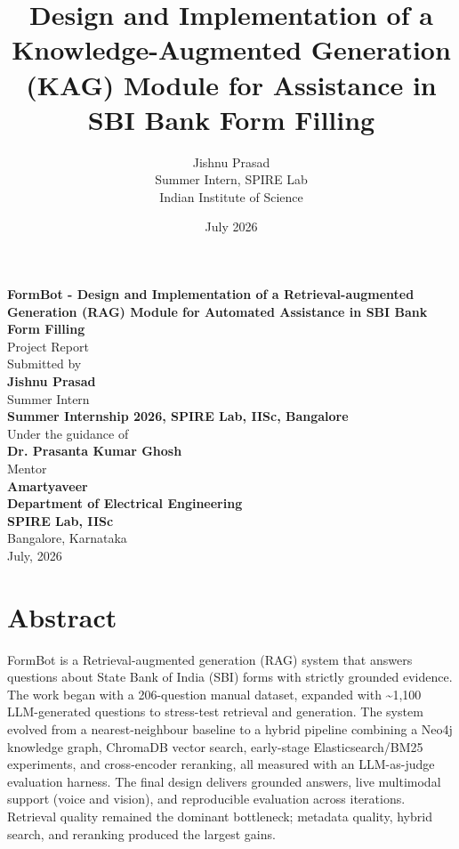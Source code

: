 \documentclass[11pt,a4paper]{article}
\title{
    \vspace{-1.5cm}
    \textbf{\Large Design and Implementation of a Knowledge-Augmented Generation (KAG) Module for Assistance in SBI Bank Form Filling}
}
\author{
    Jishnu Prasad \\
    Summer Intern, SPIRE Lab \\
    Indian Institute of Science
}
\date{July 2026}
\begin{document}
\begin{titlepage}
\centering
\vspace*{2cm}
{\LARGE \textbf{FormBot - Design and Implementation of a Retrieval-augmented Generation (RAG) Module for Automated Assistance in SBI Bank Form Filling}}\\[1cm]
{\large Project Report}\\[2cm]

{\large Submitted by}\\[0.3cm]
{\large \textbf{Jishnu Prasad}}\\
{\large Summer Intern}\\[1.5cm]

{\large \textbf{Summer Internship 2026, SPIRE Lab, IISc, Bangalore}}\\[1.5cm]

{\large Under the guidance of}\\
{\large \textbf{Dr. Prasanta Kumar Ghosh}}\\

{\large Mentor}\\
{\large \textbf{Amartyaveer}}\\

\vfill
{\large \textbf{Department of Electrical Engineering}}\\
{\large \textbf{SPIRE Lab, IISc}}\\
{\large Bangalore, Karnataka}\\
{\large July, 2026}
\end{titlepage}

\tableofcontents
\newpage

\section{Abstract}

FormBot is a Retrieval-augmented generation (RAG) system that answers questions about State Bank of India (SBI) forms with strictly grounded evidence. The work began with a 206-question manual dataset, expanded with \textasciitilde1{,}100 LLM-generated questions to stress-test retrieval and generation. The system evolved from a nearest-neighbour baseline to a hybrid pipeline combining a Neo4j knowledge graph, ChromaDB vector search, early-stage Elasticsearch/BM25 experiments, and cross-encoder reranking, all measured with an LLM-as-judge evaluation harness. The final design delivers grounded answers, live multimodal support (voice and vision), and reproducible evaluation across iterations. Retrieval quality remained the dominant bottleneck; metadata quality, hybrid search, and reranking produced the largest gains.
\end{document}
